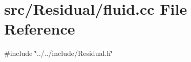 \section{src/\+Residual/fluid.cc File Reference}
\label{fluid_8cc}
{\ttfamily \#include \char`\"{}../../include/\+Residual.\+h\char`\"{}}\newline
